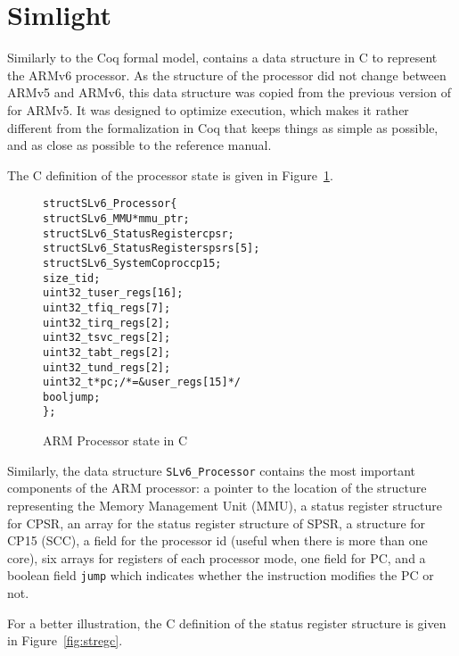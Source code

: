 \section{Simlight}
\label{sec:slv6}

Similarly to the Coq formal model,
\simlight contains a data structure in C to represent the ARMv6 processor.
As the structure of the processor did not change between ARMv5 and ARMv6,
this data structure was copied from the previous version of \simsoc for ARMv5.
%
It was designed to optimize execution,
which makes it rather different from the formalization in Coq that keeps things
as simple as possible, and as close as possible to the reference manual.

The C definition of the processor state is given in Figure~\ref{fig:procc}.

\begin{figure}
\begin{alltt}
struct SLv6_Processor \{
  struct SLv6_MMU *mmu_ptr;
  struct SLv6_StatusRegister cpsr;
  struct SLv6_StatusRegister spsrs[5];
  struct SLv6_SystemCoproc cp15;
  size_t id;
  uint32_t user_regs[16];
  uint32_t fiq_regs[7];
  uint32_t irq_regs[2];
  uint32_t svc_regs[2];
  uint32_t abt_regs[2];
  uint32_t und_regs[2];
  uint32_t *pc; /* = &user_regs[15] */
  bool jump;
\};
\end{alltt}
\caption{ARM Processor state in C}
\label{fig:procc}
\end{figure}

Similarly,
the data structure \texttt{SLv6\_Processor} contains
the most important components of the ARM processor:
a pointer to the location of the structure representing the Memory Management Unit (MMU),
a status register structure for CPSR,
an array for the status register structure of SPSR,
a structure for CP15 (SCC),
a field for the processor id (useful when there is more than one core),
six arrays for registers of each processor mode,
one field for PC,
and a boolean field \texttt{jump}
which indicates whether the instruction modifies the PC or not.

For a better illustration, the C definition of the status register structure is
given in Figure~\ref{fig:stregc}.

